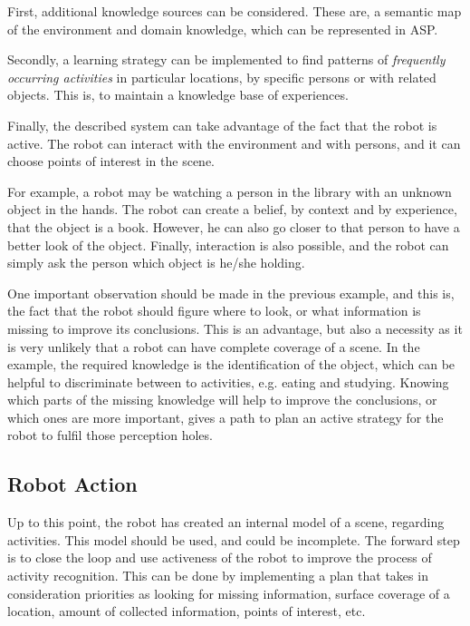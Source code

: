 First, additional knowledge sources can be considered.
These are, a semantic map of the environment and domain knowledge, which can be represented in ASP.

Secondly, a learning strategy can be implemented to find patterns of \textit{frequently occurring activities} in particular locations, by specific persons or with related objects. 
This is, to maintain a knowledge base of experiences.

Finally, the described system can take advantage of the fact that the robot is active.
The robot can interact with the environment and with persons, and it can choose points of interest in the scene.

For example, a robot may be watching a person in the library with an unknown object in the hands. 
The robot can create a belief, by context and by experience, that the object is a book.
However, he can also go closer to that person to have a better look of the object.
Finally, interaction is also possible, and the robot can simply ask the person which object is he/she holding.

One important observation should be made in the previous example, and this is, the fact that the robot should figure where to look, or what information is missing to improve its conclusions. 
This is an advantage, but also a necessity as it is very unlikely that a robot can have complete coverage of a scene.
In the example, the required knowledge is the identification of the object, which can be helpful to discriminate between to activities, e.g. eating and studying. 
Knowing which parts of the missing knowledge will help to improve the conclusions, or which ones are more important, gives a path to plan an active strategy for the robot to fulfil those perception holes.


\subsection{Robot Action}

Up to this point, the robot has created an internal model of a scene, regarding activities.
This model should be used, and could be incomplete.
The forward step is to close the loop and use activeness of the robot to improve the process of activity recognition. This can be done by implementing a plan that takes in consideration priorities as looking for missing information, surface coverage of a location, amount of collected information, points of interest, etc.






